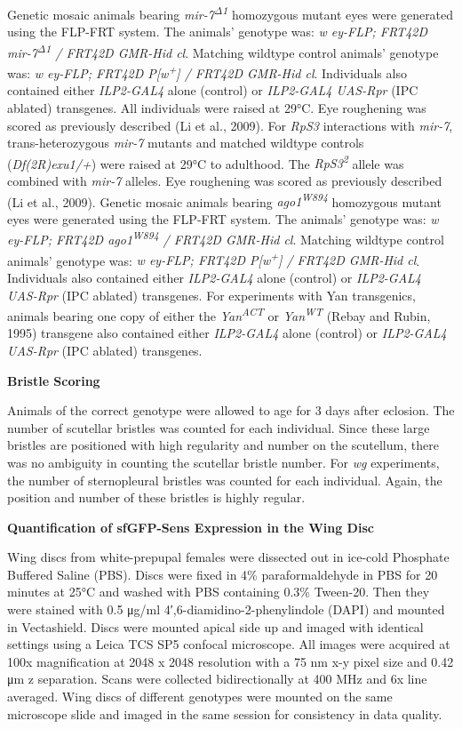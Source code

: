 Genetic mosaic animals bearing \emph{mir-7\textsuperscript{Δ1}} homozygous mutant eyes were generated using the FLP-FRT system. The animals' genotype was: \emph{w ey-FLP; FRT42D mir-7\textsuperscript{Δ1} / FRT42D GMR-Hid cl}. Matching wildtype control animals' genotype was: \emph{w ey-FLP; FRT42D P{[}w\textsuperscript{+}{]} / FRT42D GMR-Hid cl}. Individuals also contained either \emph{ILP2-GAL4} alone (control) or \emph{ILP2-GAL4 UAS-Rpr} (IPC ablated) transgenes. All individuals were raised at 29°C. Eye roughening was scored as previously described (Li et al., 2009). For \emph{RpS3} interactions with \emph{mir-7}, trans-heterozygous \emph{mir-7} mutants and matched wildtype controls (\emph{Df(2R)exu1/+}) were raised at 29°C to adulthood. The \emph{RpS3\textsuperscript{2}} allele was combined with \emph{mir-7} alleles. Eye roughening was scored as previously described (Li et al., 2009). Genetic mosaic animals bearing \emph{ago1\textsuperscript{W894}} homozygous mutant eyes were generated using the FLP-FRT system. The animals' genotype was: \emph{w ey-FLP; FRT42D ago1\textsuperscript{W894} / FRT42D GMR-Hid cl}. Matching wildtype control animals' genotype was: \emph{w ey-FLP; FRT42D P{[}w\textsuperscript{+}{]} / FRT42D GMR-Hid cl}. Individuals also contained either \emph{ILP2-GAL4} alone (control) or \emph{ILP2-GAL4 UAS-Rpr} (IPC ablated) transgenes. For experiments with Yan transgenics, animals bearing one copy of either the \emph{Yan\textsuperscript{ACT}} or \emph{Yan\textsuperscript{WT}} (Rebay and Rubin, 1995) transgene also contained either \emph{ILP2-GAL4} alone (control) or \emph{ILP2-GAL4 UAS-Rpr} (IPC ablated) transgenes.

\textbf{Bristle Scoring}

Animals of the correct genotype were allowed to age for 3 days after eclosion. The number of scutellar bristles was counted for each individual. Since these large bristles are positioned with high regularity and number on the scutellum, there was no ambiguity in counting the scutellar bristle number. For \emph{wg} experiments, the number of sternopleural bristles was counted for each individual. Again, the position and number of these bristles is highly regular.

\textbf{Quantification of sfGFP-Sens Expression in the Wing Disc}

Wing discs from white-prepupal females were dissected out in ice-cold Phosphate Buffered Saline (PBS). Discs were fixed in 4\% paraformaldehyde in PBS for 20 minutes at 25°C and washed with PBS containing 0.3\% Tween-20. Then they were stained with 0.5 μg/ml 4′,6-diamidino-2-phenylindole (DAPI) and mounted in Vectashield. Discs were mounted apical side up and imaged with identical settings using a Leica TCS SP5 confocal microscope. All images were acquired at 100x magnification at 2048 x 2048 resolution with a 75 nm x-y pixel size and 0.42 μm z separation. Scans were collected bidirectionally at 400 MHz and 6x line averaged. Wing discs of different genotypes were mounted on the same microscope slide and imaged in the same session for consistency in data quality.

